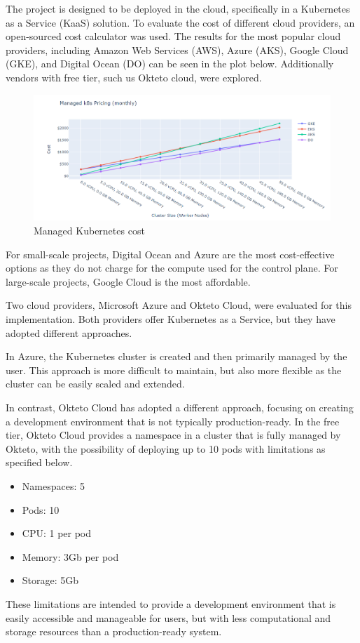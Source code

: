 The project is designed to be deployed in the cloud, specifically in a Kubernetes as a Service (KaaS) solution. To evaluate the cost of different cloud providers, an open-sourced cost calculator \cite{managed_kubernetes_pricing} was used. The results for the most popular cloud providers, including Amazon Web Services (AWS), Azure (AKS), Google Cloud (GKE), and Digital Ocean (DO) can be seen in the plot below. Additionally vendors with free tier, such us Okteto cloud, were explored.

\begin{figure}[H]
    \centering
    \includegraphics[width=\textwidth]{pictures/k8s_cost.png}
    \caption{Managed Kubernetes cost}
    \label{fig:k8s_cost}
\end{figure}

For small-scale projects, Digital Ocean and Azure are the most cost-effective options as they do not charge for the compute used for the control plane. For large-scale projects, Google Cloud is the most affordable.

Two cloud providers, Microsoft Azure and Okteto Cloud, were evaluated for this implementation. Both providers offer Kubernetes as a Service, but they have adopted different approaches.

In Azure, the Kubernetes cluster is created and then primarily managed by the user. This approach is more difficult to maintain, but also more flexible as the cluster can be easily scaled and extended.

In contrast, Okteto Cloud has adopted a different approach, focusing on creating a development environment that is not typically production-ready. In the free tier, Okteto Cloud provides a namespace in a cluster that is fully managed by Okteto, with the possibility of deploying up to 10 pods with limitations as specified below.
\begin{itemize}
\itemsep0em
    \item Namespaces: 5
    \item Pods: 10
    \item CPU: 1 per pod
    \item Memory: 3Gb per pod
    \item Storage: 5Gb
\end{itemize}
These limitations are intended to provide a development environment that is easily accessible and manageable for users, but with less computational and storage resources than a production-ready system.

